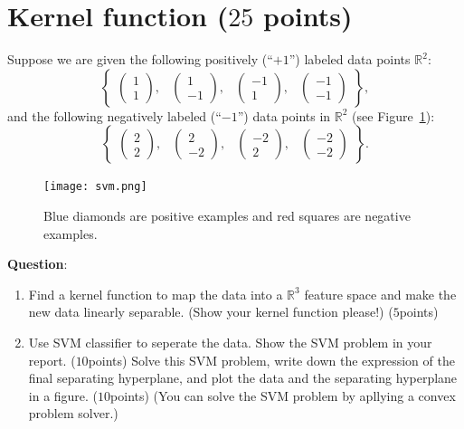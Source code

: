 \documentclass[10pt]{article}
\begin{document}
\section*{Kernel function ($25$ points)}
Suppose we are given the following positively (``$+1$'') labeled data points $\mathbb{R}^2$:
$$
\begin{Bmatrix}
\begin{pmatrix}
1\\ 
1
\end{pmatrix} ,&
\begin{pmatrix}
1\\ 
-1
\end{pmatrix}  ,&
\begin{pmatrix}
-1\\ 
1
\end{pmatrix} ,&
\begin{pmatrix}
-1\\ 
-1
\end{pmatrix}
\end{Bmatrix},
$$
and the following negatively labeled (``$-1$'') data points in $\mathbb{R}^2$ (see Figure~\ref{fig:svm}):
$$
\begin{Bmatrix}
\begin{pmatrix}
2\\ 
2
\end{pmatrix} ,&
\begin{pmatrix}
2\\ 
-2
\end{pmatrix}  ,&
\begin{pmatrix}
-2\\ 
2
\end{pmatrix} ,&
\begin{pmatrix}
-2\\ 
-2
\end{pmatrix}
\end{Bmatrix}.
$$
\begin{figure}[h!]
	\centering
	\texttt{[image: svm.png]}
	\caption{Blue diamonds are positive examples and red squares are negative examples.}
	\label{fig:svm}
\end{figure}	
\textbf{Question}: 
\begin{enumerate}
	\item Find a kernel function to map the data into a $\mathbb{R}^3$ feature space and make the new data linearly separable. (Show your kernel function please!) ($5$points)
	\item Use SVM classifier to seperate the data. Show the SVM problem in your report. ($10$points) Solve this SVM problem, write down the expression of the final separating hyperplane, and plot the data and the separating hyperplane in a figure. ($10$points) (You can solve the SVM problem by apllying a convex problem solver.)
\end{enumerate}

	
	
	
\end{document}
